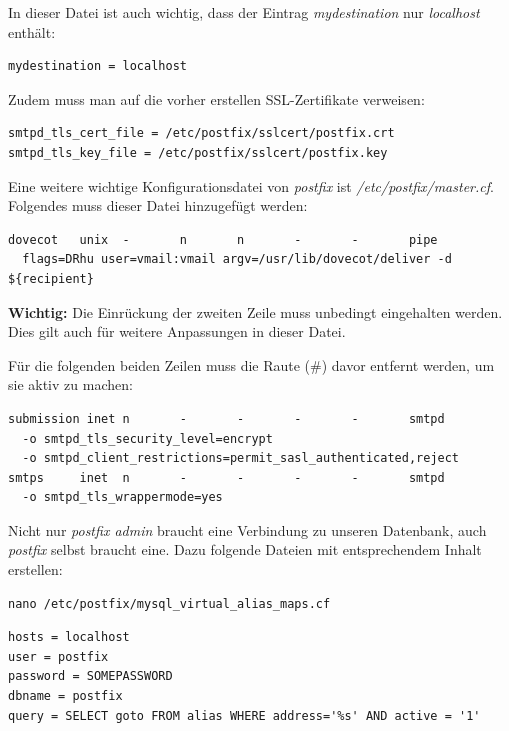 In dieser Datei ist auch wichtig, dass der Eintrag \textit{mydestination} nur \textit{localhost} enthält:

\begin{lstlisting}
mydestination = localhost
\end{lstlisting}

Zudem muss man auf die vorher erstellen SSL-Zertifikate verweisen:

\begin{lstlisting}
smtpd_tls_cert_file = /etc/postfix/sslcert/postfix.crt
smtpd_tls_key_file = /etc/postfix/sslcert/postfix.key
\end{lstlisting}

Eine weitere wichtige Konfigurationsdatei von \textit{postfix} ist \textit{/etc/postfix/master.cf}. \\
Folgendes muss dieser Datei hinzugefügt werden:

\begin{lstlisting}
dovecot   unix  -       n       n       -       -       pipe
  flags=DRhu user=vmail:vmail argv=/usr/lib/dovecot/deliver -d ${recipient}
\end{lstlisting}

\textbf{Wichtig:} Die Einrückung der zweiten Zeile muss unbedingt eingehalten werden. Dies gilt auch für weitere Anpassungen in dieser Datei.

Für die folgenden beiden Zeilen muss die Raute (\#) davor entfernt werden, um sie aktiv zu machen:

\begin{lstlisting}
submission inet n       -       -       -       -       smtpd
  -o smtpd_tls_security_level=encrypt
  -o smtpd_client_restrictions=permit_sasl_authenticated,reject
smtps     inet  n       -       -       -       -       smtpd
  -o smtpd_tls_wrappermode=yes
\end{lstlisting}


Nicht nur \textit{postfix admin} braucht eine Verbindung zu unseren Datenbank, auch \textit{postfix} selbst braucht eine. Dazu folgende Dateien mit entsprechendem Inhalt erstellen:

\begin{lstlisting}
nano /etc/postfix/mysql_virtual_alias_maps.cf
\end{lstlisting}

\begin{lstlisting}
hosts = localhost
user = postfix
password = SOMEPASSWORD
dbname = postfix
query = SELECT goto FROM alias WHERE address='%s' AND active = '1'
\end{lstlisting}

